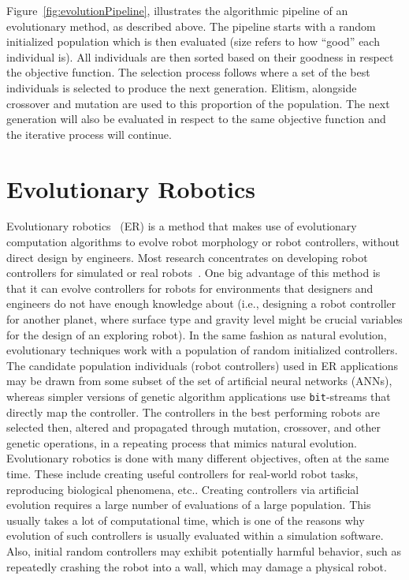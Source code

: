 Figure~\ref{fig:evolutionPipeline}, illustrates the algorithmic pipeline of an evolutionary method, as described above. The pipeline starts with a random initialized population which is then evaluated (size refers to how ``good'' each individual is). All individuals are then sorted based on their goodness in respect the objective function. The selection process follows where a set of the best individuals is selected to produce the next generation. Elitism, alongside crossover and mutation are used to this proportion of the population. The next generation will also be evaluated in respect to the same objective function and the iterative process will continue.

\section{Evolutionary Robotics}
\label{sec:evolutionary_robotics}

Evolutionary robotics~\citep{nolfi2001evolutionary} (ER) is a method that makes use of evolutionary computation algorithms to evolve robot morphology or robot controllers, without direct design by engineers. Most research concentrates on developing robot controllers for simulated or real robots~\citep{harvey1997evolutionary,nolfi1994evolve}. One big advantage of this method is that it can evolve controllers for robots for environments that designers and engineers do not have enough knowledge about (i.e., designing a robot controller for another planet, where surface type and gravity level might be crucial variables for the design of an exploring robot). In the same fashion as natural evolution, evolutionary techniques work with a population of random initialized controllers. The candidate population individuals (robot controllers) used in ER applications may be drawn from some subset of the set of artificial neural networks (ANNs), whereas simpler versions of genetic algorithm applications use \texttt{bit}-streams that directly map the controller. The controllers in the best performing robots are selected then, altered and propagated through mutation, crossover, and other genetic operations, in a repeating process that mimics natural evolution. Evolutionary robotics is done with many different objectives, often at the same time. These include creating useful controllers for real-world robot tasks, reproducing biological phenomena, etc.. Creating controllers via artificial evolution requires a large number of evaluations of a large population. This usually takes a lot of computational time, which is one of the reasons why evolution of such controllers is usually evaluated within a simulation software. Also, initial random controllers may exhibit potentially harmful behavior, such as repeatedly crashing the robot into a wall, which may damage a physical robot.

